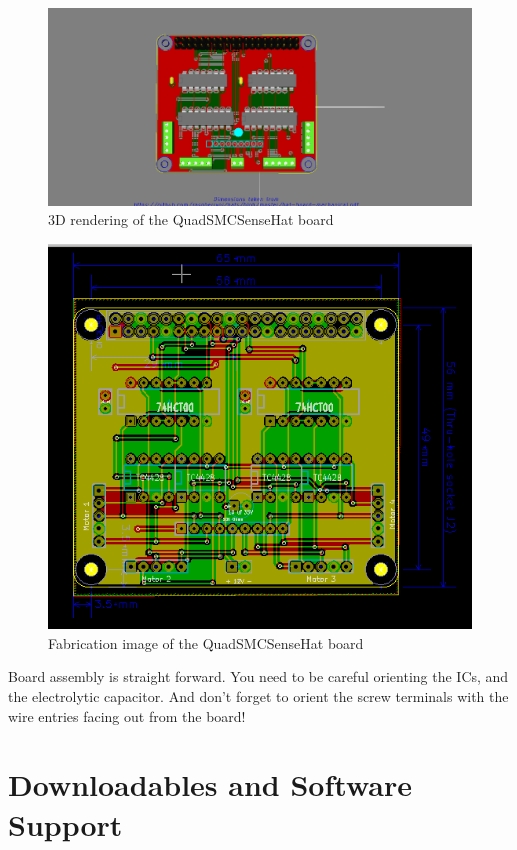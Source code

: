 \begin{figure}[hbpt]\begin{centering}%
\includegraphics[width=5in]{QuadSMCSenseHat3DTop.png}
\caption{3D rendering of the QuadSMCSenseHat board}
\end{centering}\end{figure}
\begin{figure}[hbpt]\begin{centering}%
\includegraphics[width=5in]{QuadSMCSenseHat.png}
\caption{Fabrication image of the QuadSMCSenseHat board}
\end{centering}\end{figure}
Board assembly is straight forward.  You need to be careful orienting the ICs, 
and the electrolytic capacitor.  And don't forget to orient the screw 
terminals with the wire entries facing out from the board!

\section{Downloadables and Software Support}

